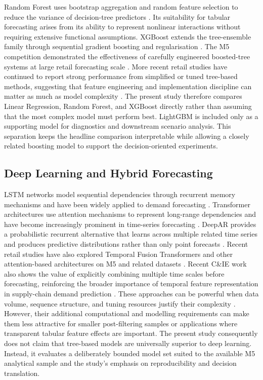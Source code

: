 Random Forest uses bootstrap aggregation and random feature selection to reduce the variance of decision-tree predictors \cite{Breiman2001RF}.
Its suitability for tabular forecasting arises from its ability to represent nonlinear interactions without requiring extensive functional assumptions.
XGBoost extends the tree-ensemble family through sequential gradient boosting and regularisation \cite{Chen2016XGBoost}.
The M5 competition demonstrated the effectiveness of carefully engineered boosted-tree systems at large retail forecasting scale \cite{Makridakis2022M5}.
More recent retail studies have continued to report strong performance from simplified or tuned tree-based methods, suggesting that feature engineering and implementation discipline can matter as much as model complexity \cite{OptimizedHyperparams2025,Deepak2025RFLinear,Sattar2025SCM}.
The present study therefore compares Linear Regression, Random Forest, and XGBoost directly rather than assuming that the most complex model must perform best.
LightGBM is included only as a supporting model for diagnostics and downstream scenario analysis.
This separation keeps the headline comparison interpretable while allowing a closely related boosting model to support the decision-oriented experiments.

\subsection{Deep Learning and Hybrid Forecasting}

LSTM networks model sequential dependencies through recurrent memory mechanisms and have been widely applied to demand forecasting \cite{Theodoridis2025LSTMixer}.
Transformer architectures use attention mechanisms to represent long-range dependencies and have become increasingly prominent in time-series forecasting \cite{Lim2021TFT}.
DeepAR provides a probabilistic recurrent alternative that learns across multiple related time series and produces predictive distributions rather than only point forecasts \cite{Long2025ProbRetail}.
Recent retail studies have also explored Temporal Fusion Transformers and other attention-based architectures on M5 and related datasets \cite{Theodoridis2025LSTMixer,Shahzad2025ThreeSTF,Yang2025MARL}.
Recent C\&IE work also shows the value of explicitly combining multiple time scales before forecasting, reinforcing the broader importance of temporal feature representation in supply-chain demand prediction \cite{Naser2025SPINEX}.
These approaches can be powerful when data volume, sequence structure, and tuning resources justify their complexity \cite{Yang2025MARL,Shahzad2025ThreeSTF,Feda2026SHAPRetail}.
However, their additional computational and modelling requirements can make them less attractive for smaller post-filtering samples or applications where transparent tabular feature effects are important.
The present study consequently does not claim that tree-based models are universally superior to deep learning.
Instead, it evaluates a deliberately bounded model set suited to the available M5 analytical sample and the study's emphasis on reproducibility and decision translation.

